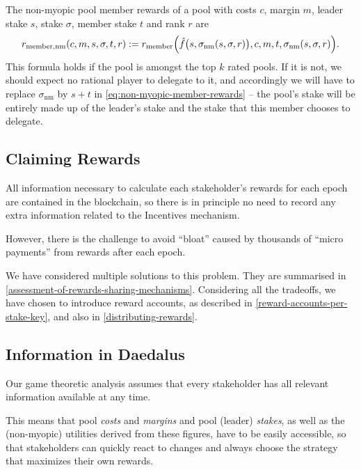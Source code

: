 \documentclass[11pt,a4paper]{article}
\begin{document}
The non-myopic pool member rewards of a pool with costs \(c\), margin
\(m\), leader stake \(s\), stake \(\sigma\), member stake \(t\) and rank
\(r\) are
\begin{equation}
    r_\mathrm{member, nm}(c, m, s, \sigma, t, r) :=
    r_\mathrm{member}\Bigl(\hat{f}\bigl(s,\sigma_\mathrm{nm}(s,\sigma, r)\bigr), c, m, t, \sigma_\mathrm{nm}(s,\sigma,r)\Bigr).
\label{eq:non-myopic-member-rewards}
\end{equation}
This formula holds if the pool is amongst the top \(k\) rated pools. If it is
not, we should expect no rational player to delegate to it, and accordingly we
will have to replace \(\sigma_\mathrm{nm}\) by \(s + t\) in
\cref{eq:non-myopic-member-rewards} -- the pool's stake will be entirely made up
of the leader's stake and the stake that this member chooses to delegate.

\subsection{Claiming Rewards}
\label{claiming-rewards}

All information necessary to calculate each stakeholder's rewards for
each epoch are contained in the blockchain, so there is in principle no
need to record any extra information related to the Incentives
mechanism.

However, there is the challenge to avoid ``bloat'' caused by thousands
of ``micro payments'' from rewards after each epoch.

We have considered multiple solutions to this problem. They are summarised in
\cref{assessment-of-rewards-sharing-mechanisms}. Considering all the tradeoffs,
we have chosen to introduce reward accounts, as described in
\cref{reward-accounts-per-stake-key}, and also in \cref{distributing-rewards}.

\subsection{Information in Daedalus}
\label{information-in-daedalus}

Our game theoretic analysis assumes that every stakeholder has all
relevant information available at any time.

This means that pool \emph{costs} and \emph{margins} and pool (leader)
\emph{stakes}, as well as the (non-myopic) utilities derived from these
figures, have to be easily accessible, so that stakeholders can quickly
react to changes and always choose the strategy that maximizes their own
rewards.
\end{document}
